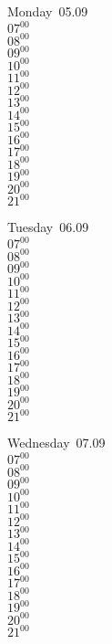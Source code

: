 \documentclass[11pt,a4paper]{book}\usepackage[]{graphicx}\usepackage[]{color}
\begin{document}
\begin{headerbox}
\end{headerbox}
\begin{weekdaybox}
  Monday~05.09\\
  { 
  \vfill
  $07^{00}$\\
$08^{00}$\\
$09^{00}$\\
$10^{00}$\\
$11^{00}$\\
$12^{00}$\\
$13^{00}$\\
$14^{00}$\\
$15^{00}$\\
$16^{00}$\\
$17^{00}$\\
$18^{00}$\\
$19^{00}$\\
$20^{00}$\\
$21^{00}$\\
  }
\end{weekdaybox}
\begin{weekdaybox}
  Tuesday~06.09\\
  { 
  \vfill
  $07^{00}$\\
$08^{00}$\\
$09^{00}$\\
$10^{00}$\\
$11^{00}$\\
$12^{00}$\\
$13^{00}$\\
$14^{00}$\\
$15^{00}$\\
$16^{00}$\\
$17^{00}$\\
$18^{00}$\\
$19^{00}$\\
$20^{00}$\\
$21^{00}$\\
  }
\end{weekdaybox}
\begin{weekdaybox}
  Wednesday~07.09\\
  { 
  \vfill
  $07^{00}$\\
$08^{00}$\\
$09^{00}$\\
$10^{00}$\\
$11^{00}$\\
$12^{00}$\\
$13^{00}$\\
$14^{00}$\\
$15^{00}$\\
$16^{00}$\\
$17^{00}$\\
$18^{00}$\\
$19^{00}$\\
$20^{00}$\\
$21^{00}$\\
  }
\end{weekdaybox}
\end{document}
